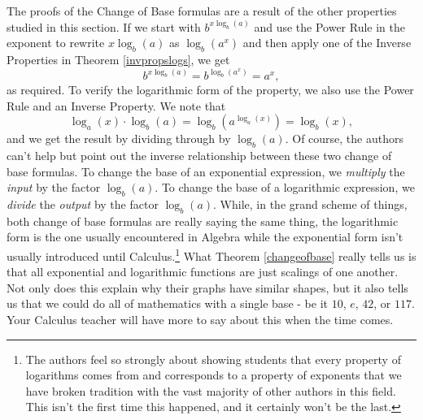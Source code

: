 The proofs of the Change of Base formulas are a result of the other properties studied in this section.  If we start with $b^{x \log_{b}(a)}$ and use the Power Rule in the exponent to rewrite $x \log_{b}(a)$ as $\log_{b}\left(a^{x}\right)$ and then apply one of the Inverse Properties in Theorem \ref{invpropslogs}, we get \[ b^{x \log_{b}(a)} = b^{\log_{b}\left(a^{x}\right)} = a^{x},\] as required.  To verify the logarithmic form of the property, we also use the Power Rule and an Inverse Property. We note that \[\log_{a}(x) \cdot \log_{b}(a) =  \log_{b} \left(a^{\log_{a}(x)}\right) = \log_{b}(x),\] and we get the result by dividing through by $\log_{b}(a)$.  Of course, the authors can't help but point out the inverse relationship between these two change of base formulas.  To change the base of an exponential expression, we \textit{multiply} the \textit{input} by the factor $\log_{b}(a)$.  To change the base of a logarithmic expression, we \textit{divide} the \textit{output} by the factor $\log_{b}(a)$.  While, in the grand scheme of things, both change of base formulas are really saying the same thing, the logarithmic form is the one usually encountered in Algebra while the exponential form isn't usually introduced until Calculus.\footnote{The authors feel so strongly about showing students that every property of logarithms comes from and corresponds to a property of exponents that we have broken tradition with the vast majority of other authors in this field.  This isn't the first time this happened, and it certainly won't be the last.} What Theorem \ref{changeofbase} really tells us is that all exponential and logarithmic functions are just scalings of one another.  Not only does this explain why their graphs have similar shapes, but it also tells us that we could do all of mathematics with a single base - be it $10$, $e$, $42$, or $117$.  Your Calculus teacher will have more to say about this when the time comes.


